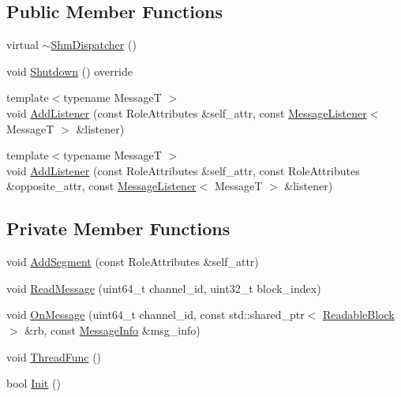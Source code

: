 \subsection*{Public Member Functions}
\begin{DoxyCompactItemize}
\item 
virtual \hyperlink{classapollo_1_1cyber_1_1transport_1_1ShmDispatcher_a10fe3a6434f0385a11ca390dc7037503}{$\sim$\-Shm\-Dispatcher} ()
\item 
void \hyperlink{classapollo_1_1cyber_1_1transport_1_1ShmDispatcher_a8924e420134ea725eb03a680bb98abd7}{Shutdown} () override
\item 
{\footnotesize template$<$typename Message\-T $>$ }\\void \hyperlink{classapollo_1_1cyber_1_1transport_1_1ShmDispatcher_a752dd5b2c4f1b566d32160937161063d}{Add\-Listener} (const Role\-Attributes \&self\-\_\-attr, const \hyperlink{namespaceapollo_1_1cyber_1_1transport_aade3f4d41770972ae44166cdde27e2d8}{Message\-Listener}$<$ Message\-T $>$ \&listener)
\item 
{\footnotesize template$<$typename Message\-T $>$ }\\void \hyperlink{classapollo_1_1cyber_1_1transport_1_1ShmDispatcher_a5f2ee158930e0225422f75d5e72c71b6}{Add\-Listener} (const Role\-Attributes \&self\-\_\-attr, const Role\-Attributes \&opposite\-\_\-attr, const \hyperlink{namespaceapollo_1_1cyber_1_1transport_aade3f4d41770972ae44166cdde27e2d8}{Message\-Listener}$<$ Message\-T $>$ \&listener)
\end{DoxyCompactItemize}
\subsection*{Private Member Functions}
\begin{DoxyCompactItemize}
\item 
void \hyperlink{classapollo_1_1cyber_1_1transport_1_1ShmDispatcher_a30b5a72d09a9f2e490011763bc434ef4}{Add\-Segment} (const Role\-Attributes \&self\-\_\-attr)
\item 
void \hyperlink{classapollo_1_1cyber_1_1transport_1_1ShmDispatcher_a379e1e4f7c592f606b3f1e0e39333c64}{Read\-Message} (uint64\-\_\-t channel\-\_\-id, uint32\-\_\-t block\-\_\-index)
\item 
void \hyperlink{classapollo_1_1cyber_1_1transport_1_1ShmDispatcher_ac91a401dc4c06f6e00cb33c5be24ab20}{On\-Message} (uint64\-\_\-t channel\-\_\-id, const std\-::shared\-\_\-ptr$<$ \hyperlink{namespaceapollo_1_1cyber_1_1transport_a38f70b996ac896a1bc06d4598f1d0070}{Readable\-Block} $>$ \&rb, const \hyperlink{classapollo_1_1cyber_1_1transport_1_1MessageInfo}{Message\-Info} \&msg\-\_\-info)
\item 
void \hyperlink{classapollo_1_1cyber_1_1transport_1_1ShmDispatcher_a7d6e4e96c0604330fb2aea3284d5d362}{Thread\-Func} ()
\item 
bool \hyperlink{classapollo_1_1cyber_1_1transport_1_1ShmDispatcher_affe533d42be32ee45ffc80630c24111a}{Init} ()
\end{DoxyCompactItemize}
